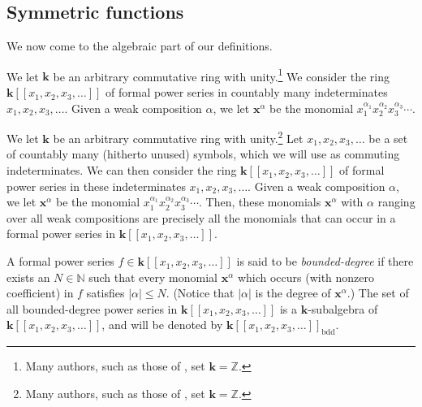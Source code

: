 \documentclass[numbers=enddot,12pt,final,onecolumn,notitlepage]{scrartcl}%
\theoremstyle{definition}
\newenvironment{verlong}{}{}
\newenvironment{vershort}{}{}
\begin{document}
\subsection{Symmetric functions}

We now come to the algebraic part of our definitions.

\begin{vershort}
We let $\mathbf{k}$ be an arbitrary commutative ring with unity.\footnote{Many
authors, such as those of \cite{LamPyl}, set $\mathbf{k}=\mathbb{Z}$.} We
consider the ring $\mathbf{k}\left[  \left[  x_{1},x_{2},x_{3},\ldots\right]
\right]  $ of formal power series in countably many indeterminates
$x_{1},x_{2},x_{3},\ldots$. Given a weak composition $\alpha$, we let
$\mathbf{x}^{\alpha}$ be the monomial $x_{1}^{\alpha_{1}}x_{2}^{\alpha_{2}%
}x_{3}^{\alpha_{3}}\cdots$.
\end{vershort}

\begin{verlong}
We let $\mathbf{k}$ be an arbitrary commutative ring with unity.\footnote{Many
authors, such as those of \cite{LamPyl}, set $\mathbf{k}=\mathbb{Z}$.} Let
$x_{1},x_{2},x_{3},\ldots$ be a set of countably many (hitherto unused)
symbols, which we will use as commuting indeterminates. We can then consider
the ring $\mathbf{k}\left[  \left[  x_{1},x_{2},x_{3},\ldots\right]  \right]
$ of formal power series in these indeterminates $x_{1},x_{2},x_{3},\ldots$.
Given a weak composition $\alpha$, we let $\mathbf{x}^{\alpha}$ be the
monomial $x_{1}^{\alpha_{1}}x_{2}^{\alpha_{2}}x_{3}^{\alpha_{3}}\cdots$. Then,
these monomials $\mathbf{x}^{\alpha}$ with $\alpha$ ranging over all weak
compositions are precisely all the monomials that can occur in a formal power
series in $\mathbf{k}\left[  \left[  x_{1},x_{2},x_{3},\ldots\right]  \right]
$.
\end{verlong}

A formal power series $f\in\mathbf{k}\left[  \left[  x_{1},x_{2},x_{3}%
,\ldots\right]  \right]  $ is said to be \textit{bounded-degree} if there
exists an $N\in\mathbb{N}$ such that every monomial $\mathbf{x}^{\alpha}$
which occurs (with nonzero coefficient) in $f$ satisfies $\left\vert
\alpha\right\vert \leq N$. (Notice that $\left\vert \alpha\right\vert $ is the
degree of $\mathbf{x}^{\alpha}$.) The set of all bounded-degree power series
in $\mathbf{k}\left[  \left[  x_{1},x_{2},x_{3},\ldots\right]  \right]  $ is a
$\mathbf{k}$-subalgebra of $\mathbf{k}\left[  \left[  x_{1},x_{2},x_{3}%
,\ldots\right]  \right]  $, and will be denoted by $\mathbf{k}\left[  \left[
x_{1},x_{2},x_{3},\ldots\right]  \right]  _{\operatorname*{bdd}}$.
\end{document}
